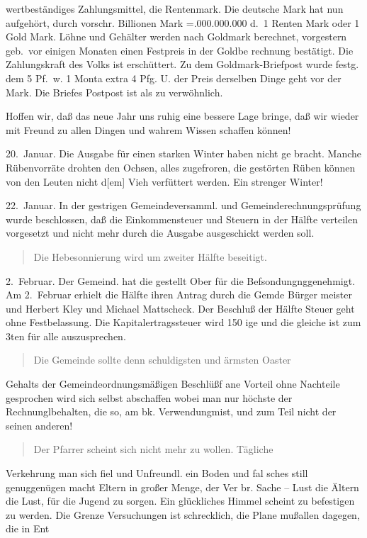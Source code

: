 

wertbeständiges Zahlungsmittel, die Rentenmark. Die deutsche\ob
Mark hat nun aufgehört, durch vorschr. Billionen Mark =.000.000.000 d.\ 1 Renten Mark oder 1 Gold Mark.\ob
Löhne und Gehälter werden nach Goldmark berechnet, vorgestern\ob
geb.\ vor einigen Monaten einen Festpreis in der Goldbe\ohb
rechnung bestätigt. Die Zahlungskraft des Volks ist erschüttert.\ob
Zu dem Goldmark-Briefpost wurde festg. dem 5 Pf.\ w. 1 Monta\unsicher\ob
extra 4 Pfg. U. der Preis derselben Dinge geht vor der Mark.\ob
Die Briefes Postpost ist als zu verwöhnlich.

Hoffen wir, daß das neue Jahr uns ruhig eine bessere\ob
Lage bringe, daß wir wieder mit Freund zu allen Dingen\ob
und wahrem Wissen schaffen können!

20.\ Januar.   Die Ausgabe für einen starken Winter haben nicht ge\ohb
bracht. Manche Rübenvorräte drohten den Ochsen, alles\ob
zugefroren, die gestörten Rüben können von den Leuten\ob
nicht d{[em]} Vieh verfüttert werden. Ein strenger Winter!

22.\ Januar.   In der gestrigen Gemeindeversamml. und Gemeinderechnungsprüfung\ob
wurde beschlossen, daß die Einkommensteuer und Steuern\ob
in der Hälfte verteilen vorgesetzt und nicht mehr durch\ob
die Ausgabe ausgeschickt werden soll.

\pend
\begin{verse}
Die Hebesonnierung wird um zweiter Hälfte beseitigt.
\end{verse}
\pstart

2.\ Februar.   Der Gemeind. hat die gestellt Ober für die Befsondungng\unsicher genehmigt.\ob
Am 2.\ Februar erhielt die Hälfte ihren Antrag durch die Gemde Bürger\ohb
meister und Herbert Kley und Michael Mattscheck\unsicher. Der Beschluß der Hälfte\ob
Steuer geht ohne Festbelassung. Die Kapitalertragssteuer wird 150%
ige und die gleiche ist zum 3ten für alle auszusprechen.

\pend
\begin{verse}
Die Gemeinde sollte denn schuldigsten und ärmsten Oaster
\end{verse}
\pstart
Gehalts der Gemeindeordnungsmäßigen Beschlüßf ane Vorteil ohne\ob
Nachteile gesprochen wird sich selbst abschaffen wobei man nur\ob
höchste der Rechnungl\unsicher behalten, die so, am bk. Verwendungm\unsicher ist, und\ob
zum Teil nicht der seinen anderen!

\pend
\begin{verse}
Der Pfarrer scheint sich nicht mehr zu wollen. Tägliche
\end{verse}
\pstart
Verkehrung man sich fiel und Unfreundl. ein Boden und fal\ohb
sches still genuggenügen macht Eltern in großer Menge, der Ver\ohb
br. Sache – Lust die Ältern die Lust, für die Jugend zu sorgen.\ob
Ein glückliches Himmel scheint zu befestigen zu werden. Die Grenze\ob
Versuchungen ist schrecklich, die Plane mußallen\unsicher{} dagegen, die in Ent\unsicher
\pend
